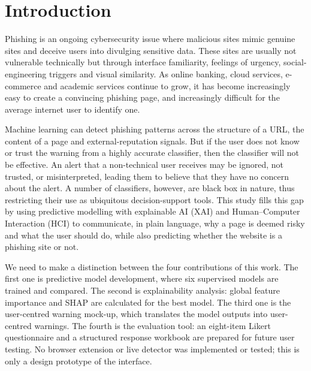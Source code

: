 \documentclass[11pt,a4paper]{article}
\begin{document}
\clearpage
{}


\section{Introduction}

Phishing is an ongoing cybersecurity issue where malicious sites mimic genuine sites
and deceive users into divulging sensitive data. These sites are usually not vulnerable
technically but through interface familiarity, feelings of urgency, social-engineering
triggers and visual similarity. As online banking, cloud services, e-commerce and
academic services continue to grow, it has become increasingly easy to create a
convincing phishing page, and increasingly difficult for the average internet user to
identify one.

Machine learning can detect phishing patterns across the structure of a URL, the content
of a page and external-reputation signals. But if the user does not know or trust the
warning from a highly accurate classifier, then the classifier will not be effective. An
alert that a non-technical user receives may be ignored, not trusted, or misinterpreted,
leading them to believe that they have no concern about the alert. A number of classifiers,
however, are black box in nature, thus restricting their use as ubiquitous decision-support
tools. This study fills this gap by using predictive modelling with explainable AI (XAI)
and Human--Computer Interaction (HCI) to communicate, in plain language, why a page is
deemed risky and what the user should do, while also predicting whether the website is a
phishing site or not.

We need to make a distinction between the four contributions of this work. The first one
is predictive model development, where six supervised models are trained and compared. The
second is explainability analysis: global feature importance and SHAP are calculated for
the best model. The third one is the user-centred warning mock-up, which translates the
model outputs into user-centred warnings. The fourth is the evaluation tool: an eight-item
Likert questionnaire and a structured response workbook are prepared for future user
testing. No browser extension or live detector was implemented or tested; this is only a
design prototype of the interface.
\end{document}

